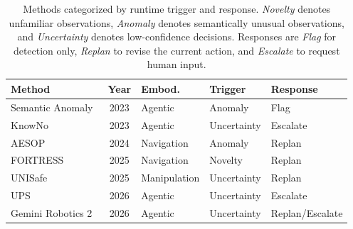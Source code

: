 \begin{table}[t]
\centering
\setlength{\tabcolsep}{4pt}
\renewcommand{\arraystretch}{1.15}

\begin{tabular}{p{2.1cm} | c | p{1.4cm} | l l}
\toprule

\textbf{Method} &
\textbf{Year} &
\textbf{Embod.} &
\textbf{Trigger} &
\textbf{Response} \\

\midrule

Semantic Anomaly~\cite{ElhafsiSinhaEtAl2023} &
2023 &
Agentic &
Anomaly &
Flag \\

KnowNo~\cite{knowno2023} &
2023 &
Agentic &
Uncertainty &
Escalate \\

AESOP~\cite{SinhaElhafsiEtAl2024} &
2024 &
Navigation &
Anomaly &
Replan \\

FORTRESS~\cite{ganai2025realtime} &
2025 &
Navigation &
Novelty &
Replan \\

UNISafe~\cite{seo2025uncertaintyaware} &
2025 &
Manipulation &
Uncertainty &
Replan \\

UPS~\cite{yuan2026when} &
2026 &
Agentic &
Uncertainty &
Escalate \\

Gemini Robotics 2~\cite{gemini2026asimovagentic} &
2026 &
Agentic &
Uncertainty &
Replan/Escalate \\

\bottomrule
\end{tabular}

\caption{Methods categorized by runtime trigger and response. \textit{Novelty} denotes unfamiliar observations, \textit{Anomaly} denotes semantically unusual observations, and \textit{Uncertainty} denotes low-confidence decisions. Responses are \textit{Flag} for detection only, \textit{Replan} to revise the current action, and \textit{Escalate} to request human input.}
\label{tab:ood_safety_roles}
\end{table}
